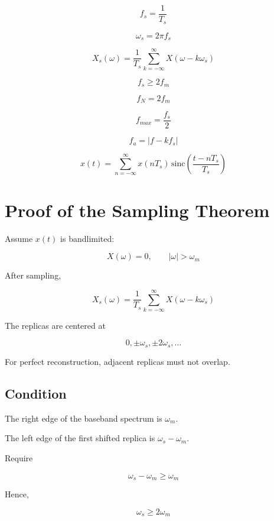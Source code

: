 \begin{tcolorbox}[title=Quick Recall,colback=blue!5]

\[
f_s=\frac{1}{T_s}
\]

\[
\omega_s=2\pi f_s
\]

\[
X_s(\omega)=
\frac{1}{T_s}
\sum_{k=-\infty}^{\infty}
X(\omega-k\omega_s)
\]

\[
f_s\ge2f_m
\]

\[
f_N=2f_m
\]

\[
f_{max}=\frac{f_s}{2}
\]

\[
f_a=|f-kf_s|
\]

\[
x(t)=
\sum_{n=-\infty}^{\infty}
x(nT_s)\,
\mathrm{sinc}\left(\frac{t-nT_s}{T_s}\right)
\]

\end{tcolorbox}
\section{Proof of the Sampling Theorem}

Assume \(x(t)\) is bandlimited:

\[
X(\omega)=0,\qquad |\omega|>\omega_m
\]

After sampling,

\[
X_s(\omega)=
\frac{1}{T_s}
\sum_{k=-\infty}^{\infty}
X(\omega-k\omega_s)
\]

The replicas are centered at

\[
0,\pm\omega_s,\pm2\omega_s,\ldots
\]

For perfect reconstruction, adjacent replicas must not overlap.


\subsection{Condition}

The right edge of the baseband spectrum is \(\omega_m\).

The left edge of the first shifted replica is \(\omega_s-\omega_m\).

Require

\[
\omega_s-\omega_m\ge\omega_m
\]

Hence,

\[
\boxed{
\omega_s\ge2\omega_m
}
\]

